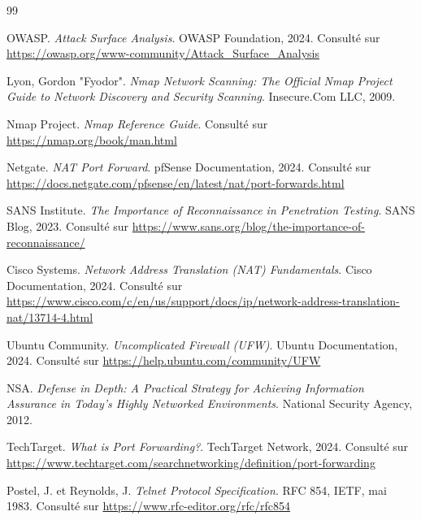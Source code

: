 \documentclass[12pt,a4paper,openany]{report}
\begin{document}
	\begin{thebibliography}{99}
		
		OWASP. \textit{Attack Surface Analysis}. OWASP Foundation, 2024. Consulté sur \url{https://owasp.org/www-community/Attack_Surface_Analysis}
		
		Lyon, Gordon "Fyodor". \textit{Nmap Network Scanning: The Official Nmap Project Guide to Network Discovery and Security Scanning}. Insecure.Com LLC, 2009.
		
		Nmap Project. \textit{Nmap Reference Guide}. Consulté sur \url{https://nmap.org/book/man.html}
		
		Netgate. \textit{NAT Port Forward}. pfSense Documentation, 2024. Consulté sur \url{https://docs.netgate.com/pfsense/en/latest/nat/port-forwards.html}
		
		SANS Institute. \textit{The Importance of Reconnaissance in Penetration Testing}. SANS Blog, 2023. Consulté sur \url{https://www.sans.org/blog/the-importance-of-reconnaissance/}
		
		Cisco Systems. \textit{Network Address Translation (NAT) Fundamentals}. Cisco Documentation, 2024. Consulté sur \url{https://www.cisco.com/c/en/us/support/docs/ip/network-address-translation-nat/13714-4.html}
		
		Ubuntu Community. \textit{Uncomplicated Firewall (UFW)}. Ubuntu Documentation, 2024. Consulté sur \url{https://help.ubuntu.com/community/UFW}
		
		NSA. \textit{Defense in Depth: A Practical Strategy for Achieving Information Assurance in Today's Highly Networked Environments}. National Security Agency, 2012.
		
		TechTarget. \textit{What is Port Forwarding?}. TechTarget Network, 2024. Consulté sur \url{https://www.techtarget.com/searchnetworking/definition/port-forwarding}
		
		Postel, J. et Reynolds, J. \textit{Telnet Protocol Specification}. RFC 854, IETF, mai 1983. Consulté sur \url{https://www.rfc-editor.org/rfc/rfc854}
		
	\end{thebibliography}
	
\end{document}
